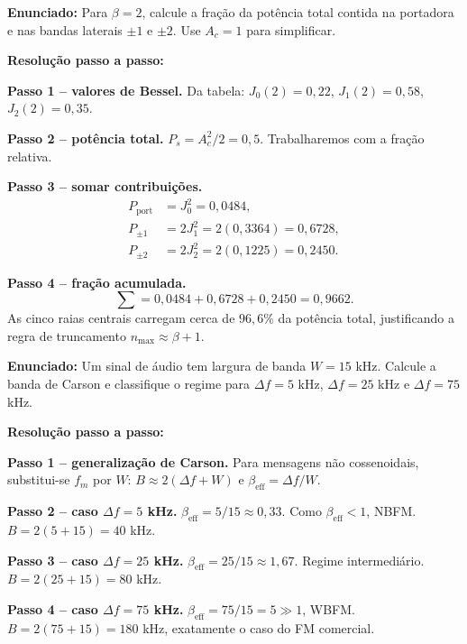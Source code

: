 \documentclass[11pt,a4paper]{article}
\begin{document}
\begin{exercicio}
\textbf{Enunciado:} Para $\beta=2$, calcule a fração da potência total contida na portadora e nas bandas laterais $\pm 1$ e $\pm 2$. Use $A_c=1$ para simplificar.

\textbf{Resolução passo a passo:}

\textbf{Passo 1 -- valores de Bessel.}
Da tabela: $J_0(2)=0{,}22$, $J_1(2)=0{,}58$, $J_2(2)=0{,}35$.

\textbf{Passo 2 -- potência total.}
$P_s = A_c^2/2 = 0{,}5$. Trabalharemos com a fração relativa.

\textbf{Passo 3 -- somar contribuições.}
\begin{align*}
  P_{\text{port}} &= J_0^2 = 0{,}0484, \\
  P_{\pm 1}       &= 2J_1^2 = 2(0{,}3364) = 0{,}6728, \\
  P_{\pm 2}       &= 2J_2^2 = 2(0{,}1225) = 0{,}2450.
\end{align*}

\textbf{Passo 4 -- fração acumulada.}
\[
  \sum = 0{,}0484 + 0{,}6728 + 0{,}2450 = 0{,}9662.
\]
As cinco raias centrais carregam cerca de $96{,}6\%$ da potência total, justificando a regra de truncamento $n_{\max}\approx\beta+1$.
\end{exercicio}

\begin{exercicio}
\textbf{Enunciado:} Um sinal de áudio tem largura de banda $W=15$ kHz. Calcule a banda de Carson e classifique o regime para $\Delta f = 5$ kHz, $\Delta f=25$ kHz e $\Delta f=75$ kHz.

\textbf{Resolução passo a passo:}

\textbf{Passo 1 -- generalização de Carson.}
Para mensagens não cossenoidais, substitui-se $f_m$ por $W$:
$B \approx 2(\Delta f + W)$ e $\beta_{\text{eff}} = \Delta f/W$.

\textbf{Passo 2 -- caso $\Delta f=5$ kHz.}
$\beta_{\text{eff}} = 5/15 \approx 0{,}33$. Como $\beta_{\text{eff}}<1$, NBFM. $B=2(5+15)=40$ kHz.

\textbf{Passo 3 -- caso $\Delta f=25$ kHz.}
$\beta_{\text{eff}} = 25/15 \approx 1{,}67$. Regime intermediário. $B=2(25+15)=80$ kHz.

\textbf{Passo 4 -- caso $\Delta f=75$ kHz.}
$\beta_{\text{eff}} = 75/15 = 5\gg 1$, WBFM. $B=2(75+15)=180$ kHz, exatamente o caso do FM comercial.
\end{exercicio}
\end{document}
